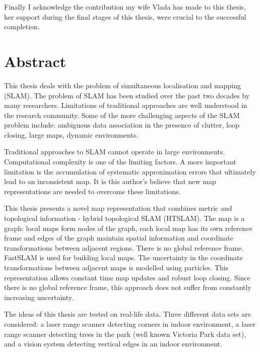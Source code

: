 \documentclass[11pt,onecolum,a4paper,oneside]{book}
\begin{document}
Finally I acknowledge the contribution my wife Vlada has made to this
thesis, her support during the final stages of this thesis, were
crucial to the successful completion.







\chapter*{Abstract}  %

This thesis deals with the problem of simultaneous localisation and
mapping (SLAM). The problem of SLAM has been studied over the past two
decades by many researchers. Limitations of traditional approaches are
well understood in the research community. Some of the more
challenging aspects of the SLAM problem include: ambiguous data
association in the presence of clutter, loop closing, large maps,
dynamic environments.

Traditional approaches to SLAM cannot operate in large
environments. Computational complexity is one of the limiting
factors. A more important limitation is the accumulation of systematic
approximation errors that ultimately lead to an inconsistent map. It is
this author's believe that new map representations are needed to
overcome these limitations.

This thesis presents a novel map representation that combines metric
and topological information - hybrid topological SLAM (HTSLAM). The
map is a graph: local maps form nodes of the graph, each local map has
its own reference frame and edges of the graph maintain spatial
information and coordinate transformations between adjacent
regions. There is no global reference frame. FastSLAM is used for
building local maps. The uncertainty in the coordinate transformations
between adjacent maps is modelled using particles. This representation
allows constant time map updates and robust loop closing. Since there
is no global reference frame, this approach does not suffer from
constantly increasing uncertainty.

The ideas of this thesis are tested on real-life data. Three different
data sets are considered: a laser range scanner detecting corners in
indoor environment, a laser range scanner detecting trees in the park
(well known Victoria Park data set), and a vision system detecting
vertical edges in an indoor environment.
\end{document}
